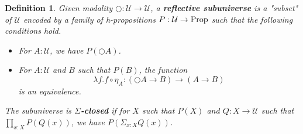 \documentclass[12pt]{article}
\newtheorem{defn}[thm]{Definition}
\begin{document}
\begin{defn}
Given modality $\bigcirc : \mathcal{U} \rightarrow \mathcal{U}$, a \textbf{reflective subuniverse} is a "subset" of $\mathcal{U}$ encoded by a family of h-propositions $P : \mathcal{U} \rightarrow \textnormal{Prop}$ such that the following conditions hold. 
\begin{itemize}
	\item For $A : \mathcal{U}$, we have $P(\bigcirc A)$.
	\item For $A : \mathcal{U}$ and $B$ such that $P(B)$, the function
	$$\lambda f.f \circ \eta_A : (\bigcirc A \rightarrow B) \rightarrow (A \rightarrow B)$$
	is an equivalence.

\end{itemize}
The subuniverse is $\Sigma$\textbf{-closed} if for $X$ such that $P(X)$ and $Q : X \rightarrow \mathcal{U}$ such that $\prod_{x : X} P(Q(x))$, we have $P(\Sigma_{x : X} Q(x))$.
\end{defn}
\end{document}
